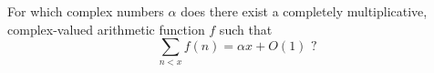 For which complex numbers $\alpha$ does there exist a completely multiplicative, complex-valued arithmetic function $f$ such that
\[
\sum_{n<x}f(n)=\alpha x+O(1)\,\,?
\]